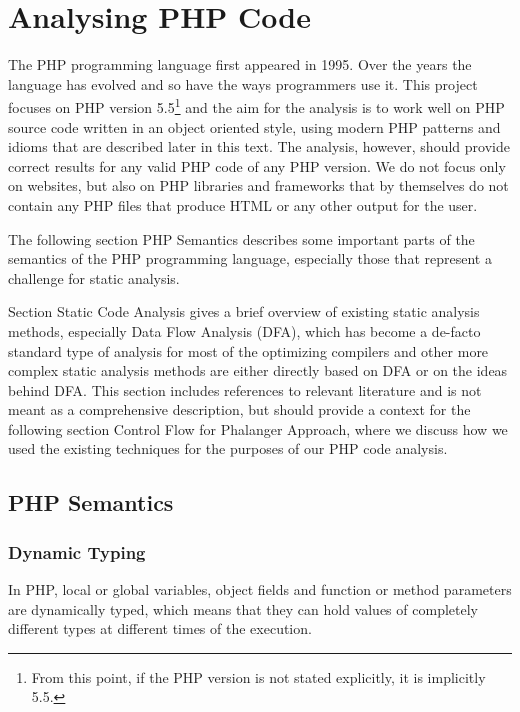 
\chapter{Analysing PHP Code}

    The PHP programming language first appeared in 1995\cite{phphist}. Over the years 
    the language has evolved and so have the ways programmers use it. 
    This project focuses on PHP version 5.5\footnote{From this point, 
    if the PHP version is not stated explicitly, it is implicitly 5.5.} 
    and the aim for the analysis 
    is to work well on PHP source code written in an object oriented style, 
    using modern PHP patterns and idioms that are described later in 
    this text. The analysis, however, should provide correct results for 
    any valid PHP code of any PHP version. We do not focus only on websites, but also on 
    PHP libraries and frameworks that by themselves do not contain 
    any PHP files that produce HTML or any other output for the user.
    
    The following section PHP Semantics describes some important parts 
    of the semantics of the PHP programming language, especially those 
    that represent a challenge for static analysis.

    Section Static Code Analysis gives a brief overview of existing 
    static analysis methods, especially Data Flow Analysis 
    (DFA)\cite{aho1985compilers}\cite{nielson1999principles}, 
    which has become a de-facto standard type of analysis for most of 
    the optimizing compilers and other more complex static analysis methods 
    are either directly based on DFA or on the ideas behind DFA. 
    This section includes references to relevant literature and 
    is not meant as a comprehensive description, but should provide a 
    context for the following section Control Flow for Phalanger Approach, 
    where we discuss how we used the existing techniques for the purposes 
    of our PHP code analysis.
    
    \section{PHP Semantics}

    \subsection{Dynamic Typing}
    In PHP, local or global variables, object fields and function or 
    method parameters are dynamically typed, which means that they 
    can hold values of completely different types at different 
    times of the execution.
    
